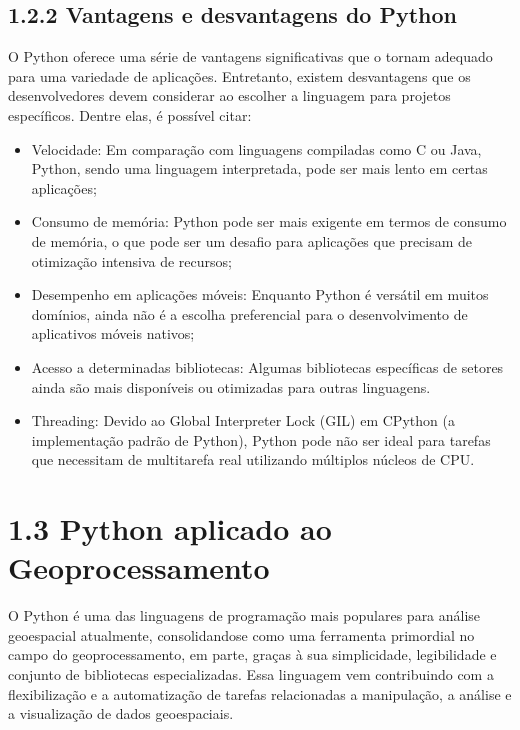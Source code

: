 \documentclass[letterpaper,10pt,english]{jupyterBook}
\begin{document}
\subsection{1.2.2 Vantagens e desvantagens do Python}
\label{\detokenize{introducao:vantagens-e-desvantagens-do-python}}
\sphinxAtStartPar
O Python oferece uma série de vantagens significativas que o tornam adequado para uma variedade de aplicações. Entretanto, existem desvantagens que os desenvolvedores devem considerar ao escolher a linguagem para projetos específicos. Dentre elas, é possível citar:
\begin{itemize}
\item {} 
\sphinxAtStartPar
Velocidade: Em comparação com linguagens compiladas como C ou Java, Python, sendo uma linguagem interpretada, pode ser mais lento em certas aplicações;

\item {} 
\sphinxAtStartPar
Consumo de memória: Python pode ser mais exigente em termos de consumo de memória, o que pode ser um desafio para aplicações que precisam de otimização intensiva de recursos;

\item {} 
\sphinxAtStartPar
Desempenho em aplicações móveis: Enquanto Python é versátil em muitos domínios, ainda não é a escolha preferencial para o desenvolvimento de aplicativos móveis nativos;

\item {} 
\sphinxAtStartPar
Acesso a determinadas bibliotecas: Algumas bibliotecas específicas de setores ainda são mais disponíveis ou otimizadas para outras linguagens.

\item {} 
\sphinxAtStartPar
Threading: Devido ao Global Interpreter Lock (GIL) em CPython (a implementação padrão de Python), Python pode não ser ideal para tarefas que necessitam de multitarefa real utilizando múltiplos núcleos de CPU.

\end{itemize}


\section{1.3 Python aplicado ao Geoprocessamento}
\label{\detokenize{introducao:python-aplicado-ao-geoprocessamento}}
\sphinxAtStartPar
O Python é uma das linguagens de programação mais populares para análise geoespacial atualmente, consolidando\sphinxhyphen{}se como uma ferramenta primordial no campo do geoprocessamento, em parte, graças à sua simplicidade, legibilidade e conjunto de bibliotecas especializadas. Essa linguagem vem contribuindo com a flexibilização e a automatização de tarefas relacionadas a manipulação, a análise e a visualização de dados geoespaciais.
\end{document}
